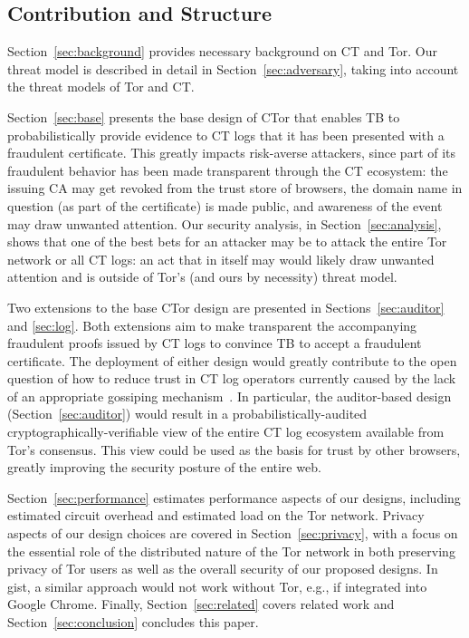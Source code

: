 \subsection{Contribution and Structure}
Section~\ref{sec:background} provides necessary background on CT and Tor. Our
threat model is described in detail in Section~\ref{sec:adversary}, taking into
account the threat models of Tor and CT\@.

Section~\ref{sec:base} presents the base design of CTor that enables TB to
probabilistically provide evidence to CT logs that it has been presented with a
fraudulent certificate. This greatly impacts risk-averse attackers, since part
of its fraudulent behavior has been made transparent through the CT ecosystem:
the issuing CA may get revoked from the trust store of browsers, the domain name
in question (as part of the certificate) is made public, and awareness of the
event may draw unwanted attention. Our security analysis, in
Section~\ref{sec:analysis}, shows that one of the best bets for an attacker may
be to attack the entire Tor network or all CT logs: an act that in itself may
would likely draw unwanted attention and is outside of Tor's (and ours by
necessity) threat model.

Two extensions to the base CTor design are presented in
Sections~\ref{sec:auditor} and \ref{sec:log}. Both extensions aim to make
transparent the accompanying fraudulent proofs issued by CT logs to convince TB
to accept a fraudulent certificate. The deployment of either design would
greatly contribute to the open question of how to reduce trust in CT log operators
currently caused by the lack of an appropriate gossiping mechanism~\cite{FIXME}.
In particular, the auditor-based design (Section~\ref{sec:auditor}) would result
in a probabilistically-audited cryptographically-verifiable view of the entire
CT log ecosystem available from Tor's consensus. This view could be used as the
basis for trust by other browsers, greatly improving the security posture of the
entire web.

Section~\ref{sec:performance} estimates performance aspects of our designs,
including estimated circuit overhead and estimated load on the Tor network.
Privacy aspects of our design choices are covered in Section~\ref{sec:privacy},
with a focus on the essential role of the distributed nature of the Tor network
in both preserving privacy of Tor users as well as the overall security of our
proposed designs. In gist, a similar approach would not work without Tor, e.g.,
if integrated into Google Chrome. Finally, Section~\ref{sec:related} covers
related work and Section~\ref{sec:conclusion} concludes this paper.

